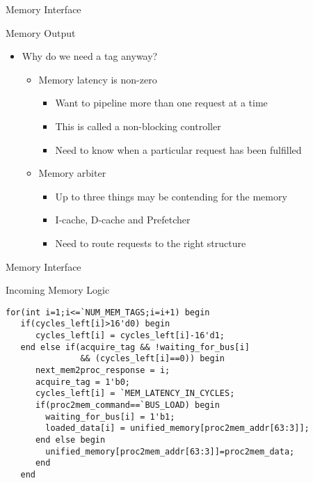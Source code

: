 \documentclass[table,dvipsnames]{beamer}
\begin{document}
\begin{frame}[fragile]{Memory Interface}
	\begin{block}{Memory Output}
	\begin{itemize}
		\item Why do we need a tag anyway?
		\begin{itemize}
			\item Memory latency is non-zero
			\begin{itemize} 
				\item Want to pipeline more than one request at a time 
				\item This is called a non-blocking controller
				\item Need to know when a particular request has been fulfilled 
			\end{itemize}
			
			\item Memory arbiter
			\begin{itemize}
				\item Up to three things may be contending for the memory
				\item I-cache, D-cache and Prefetcher
				\item Need to route requests to the right structure
			\end{itemize}
		\end{itemize}
	\end{itemize}
	\end{block}
\end{frame}


\begin{frame}[fragile]{Memory Interface}
	\begin{block}{Incoming Memory Logic}
		\begin{verbatim}
for(int i=1;i<=`NUM_MEM_TAGS;i=i+1) begin 
   if(cycles_left[i]>16'd0) begin
      cycles_left[i] = cycles_left[i]-16'd1; 
   end else if(acquire_tag && !waiting_for_bus[i] 
               && (cycles_left[i]==0)) begin 
      next_mem2proc_response = i;
      acquire_tag = 1'b0;
      cycles_left[i] = `MEM_LATENCY_IN_CYCLES; 
      if(proc2mem_command==`BUS_LOAD) begin
        waiting_for_bus[i] = 1'b1;
        loaded_data[i] = unified_memory[proc2mem_addr[63:3]]; 
      end else begin
        unified_memory[proc2mem_addr[63:3]]=proc2mem_data;
      end
   end
		\end{verbatim}
	\end{block}
\end{frame}
\end{document}
